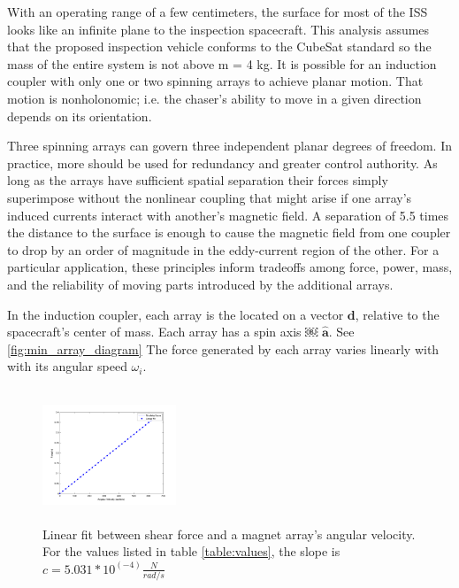 \documentclass{article}
\begin{document}
With an operating range of a few centimeters, the surface for most of the ISS looks like an infinite plane to the inspection spacecraft. This analysis assumes that the proposed inspection vehicle conforms to the CubeSat standard so the mass of the entire system is not above m = 4 kg.
It is possible for an induction coupler with only one or two spinning arrays to achieve planar motion. That motion is nonholonomic; i.e. the chaser’s ability to move in a given direction depends on its orientation.

Three spinning arrays can govern three independent planar degrees of freedom. In practice, more should be used for redundancy and greater control authority. As long as the arrays have sufficient spatial separation their forces simply superimpose without the nonlinear coupling that might arise if one array’s induced currents interact with another’s magnetic field. A separation of 5.5 times the distance to the surface is enough to cause the magnetic field from one coupler to drop by an order of magnitude in the eddy-current region of the other. For a particular application, these principles inform tradeoffs among force, power, mass, and the reliability of moving parts introduced by the additional arrays.

In the induction coupler, each array is the located on a vector $\boldsymbol{d}$, relative to the spacecraft's center of mass. Each array has a spin axis ￼ $\hat{\boldsymbol{a}}$. See \ref{fig:min_array_diagram} The force generated by each array varies linearly with with its angular speed $\omega_i$.

\begin{figure}

\includegraphics[width = 4cm, height = 4cm ]{figures/lin_fit.png}
\caption{Linear fit between shear force and a magnet array's angular velocity. For the values listed in table \ref{table:values}, the slope is $c = 5.031 * 10^(-4) \frac{N}{rad/s}$}
\label{fig:lin_fit}
\end{figure}

\end{document}
